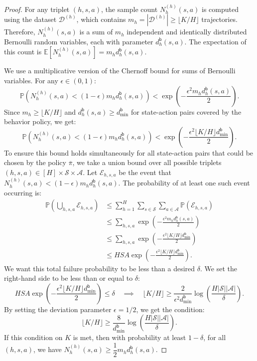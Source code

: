 \documentclass[twoside]{article}
\begin{document}
\begin{proof}
  For any triplet $(h,s,a)$, the sample count $N_h^{(h)}(s,a)$ is computed using the dataset $\mathcal{D}^{(h)}$, which contains $m_h = |\mathcal{D}^{(h)}| \ge \lfloor K/H \rfloor$ trajectories. Therefore, $N_h^{(h)}(s,a)$ is a sum of $m_h$ independent and identically distributed Bernoulli random variables, each with parameter $d^{\mathsf{b}}_{h}(s,a)$. The expectation of this count is $\mathbb{E}[N_h^{(h)}(s,a)] = m_h d^{\mathsf{b}}_{h}(s,a)$.

We use a multiplicative version of the Chernoff bound for sums of Bernoulli variables. For any $\epsilon \in (0,1)$:
\[
\mathbb{P}(N_h^{(h)}(s, a) < (1 - \epsilon)m_h d^{\mathsf{b}}_{h}(s,a)) < \exp\left(-\frac{\epsilon^2 m_h d^{\mathsf{b}}_{h}(s,a)}{2}\right).
\]
Since $m_h \ge \lfloor K/H \rfloor$ and $d^{\mathsf{b}}_{h}(s,a) \ge d^{\mathsf{b}}_{\min}$ for state-action pairs covered by the behavior policy, we get:
\[
\mathbb{P}(N_h^{(h)}(s, a) < (1 - \epsilon)m_h d^{\mathsf{b}}_{h}(s,a)) < \exp\left(-\frac{\epsilon^2\lfloor K/H \rfloor d^{\mathsf{b}}_{\min}}{2}\right).
\]
To ensure this bound holds simultaneously for all state-action pairs that could be chosen by the policy $\overline{\pi}$, we take a union bound over all possible triplets $(h,s,a) \in [H] \times \mathcal{S} \times \mathcal{A}$. Let $\mathcal{E}_{h,s,a}$ be the event that $N_h^{(h)}(s, a) < (1 - \epsilon)m_h d^{\mathsf{b}}_{h}(s,a)$. The probability of at least one such event occurring is:
\begin{align*}
    \mathbb{P}\left(\bigcup_{h,s,a} \mathcal{E}_{h,s,a}\right) & \le \sum_{h=1}^H \sum_{s\in\mathcal{S}} \sum_{a \in \mathcal{A}} \mathbb{P}(\mathcal{E}_{h,s,a}) \\
    & \le \sum_{h,s,a} \exp\left(-\frac{\epsilon^2 m_h d^{\mathsf{b}}_{h}(s,a)}{2}\right) \\
    & \le \sum_{h,s,a} \exp\left(-\frac{\epsilon^2 \lfloor K/H \rfloor d^{\mathsf{b}}_{\min}}{2}\right) \\
    & \le H S A \exp\left(-\frac{\epsilon^2 \lfloor K/H \rfloor d^{\mathsf{b}}_{\min}}{2}\right).
\end{align*}
We want this total failure probability to be less than a desired $\delta$. We set the right-hand side to be less than or equal to $\delta$:
\[
    H S A\exp\left(-\frac{\epsilon^2 \lfloor K/H \rfloor d^{\mathsf{b}}_{\min}}{2}\right) \le \delta \quad \implies \quad \lfloor K/H \rfloor \ge \frac{2}{\epsilon^2d^{\mathsf{b}}_{\min}}\log\left(\frac{H|\mathcal{S}||\mathcal{A}|}{\delta}\right).
\]
By setting the deviation parameter $\epsilon = 1/2$, we get the condition:
\[
    \lfloor K/H \rfloor \ge \frac{8}{d^{\mathsf{b}}_{\min}}\log\left(\frac{H|\mathcal{S}||\mathcal{A}|}{\delta}\right).
\]
If this condition on $K$ is met, then with probability at least $1-\delta$, for all $(h,s,a)$, we have $N_h^{(h)}(s, a) \ge \dfrac{1}{2} m_h d^{\mathsf{b}}_{h}(s,a)$. 


\end{proof}
\end{document}
